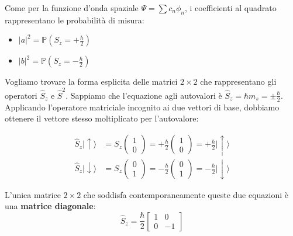 \documentclass[11pt, a4paper]{article}
\begin{document}
\noindent
Come per la funzione d'onda spaziale $\Psi = \sum c_n \phi_n$, i coefficienti al quadrato rappresentano le probabilità di misura: %
\begin{itemize}
    \item $|a|^2 = \mathbb{P}\left(S_z = +\frac{\hbar}{2}\right)$ %
    \item $|b|^2 = \mathbb{P}\left(S_z = -\frac{\hbar}{2}\right)$ %
\end{itemize}

\noindent
Vogliamo trovare la forma esplicita delle matrici $2\times 2$ che rappresentano gli operatori $\hat{S}_z$ e $\hat{S}^2$. %
Sappiamo che l'equazione agli autovalori è $\hat{S}_z = \hbar m_s = \pm \frac{\hbar}{2}$. Applicando l'operatore matriciale incognito ai due vettori di base, dobbiamo ottenere il vettore stesso moltiplicato per l'autovalore: %

\begin{align*}
    \hat{S}_z |\uparrow\rangle &= S_z \begin{pmatrix} 1 \\ 0 \end{pmatrix} = +\frac{\hbar}{2} \begin{pmatrix} 1 \\ 0 \end{pmatrix} = +\frac{\hbar}{2} |\uparrow\rangle \\ %
    \hat{S}_z |\downarrow\rangle &= S_z \begin{pmatrix} 0 \\ 1 \end{pmatrix} = -\frac{\hbar}{2} \begin{pmatrix} 0 \\ 1 \end{pmatrix} = -\frac{\hbar}{2} |\downarrow\rangle %
\end{align*}

\noindent
L'unica matrice $2\times 2$ che soddisfa contemporaneamente queste due equazioni è una \textbf{matrice diagonale}: %
\begin{equation}
    \boxed{ \hat{S}_z = \frac{\hbar}{2} \begin{bmatrix} 1 & 0 \\ 0 & -1 \end{bmatrix} } %
\end{equation}
\end{document}
